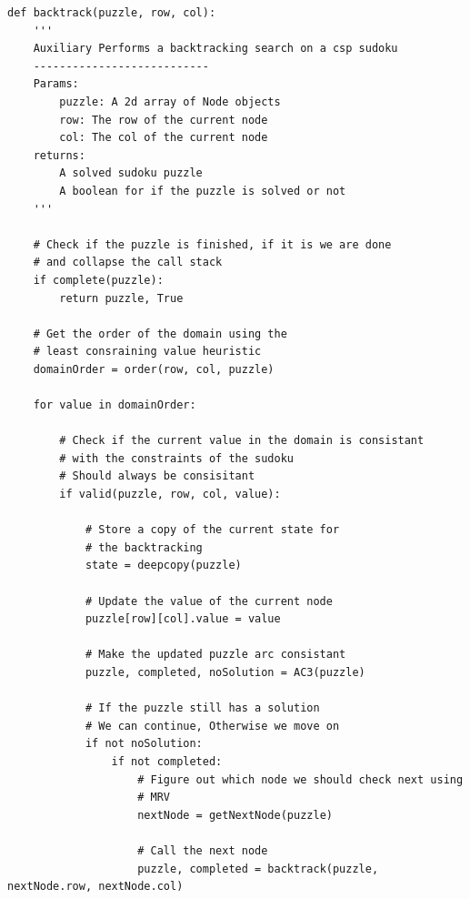 \documentclass{article}
\begin{document}
\begin{verbatim}
def backtrack(puzzle, row, col):
    '''
    Auxiliary Performs a backtracking search on a csp sudoku
    ---------------------------
    Params:
        puzzle: A 2d array of Node objects
        row: The row of the current node
        col: The col of the current node
    returns:
        A solved sudoku puzzle
        A boolean for if the puzzle is solved or not
    '''
    
    # Check if the puzzle is finished, if it is we are done
    # and collapse the call stack
    if complete(puzzle):
        return puzzle, True

    # Get the order of the domain using the
    # least consraining value heuristic
    domainOrder = order(row, col, puzzle)

    for value in domainOrder:

        # Check if the current value in the domain is consistant
        # with the constraints of the sudoku
        # Should always be consisitant
        if valid(puzzle, row, col, value):

            # Store a copy of the current state for
            # the backtracking
            state = deepcopy(puzzle)

            # Update the value of the current node
            puzzle[row][col].value = value

            # Make the updated puzzle arc consistant
            puzzle, completed, noSolution = AC3(puzzle)

            # If the puzzle still has a solution
            # We can continue, Otherwise we move on 
            if not noSolution:
                if not completed:
                    # Figure out which node we should check next using
                    # MRV
                    nextNode = getNextNode(puzzle)

                    # Call the next node
                    puzzle, completed = backtrack(puzzle, nextNode.row, nextNode.col)
\end{verbatim}
\newpage
\end{document}

